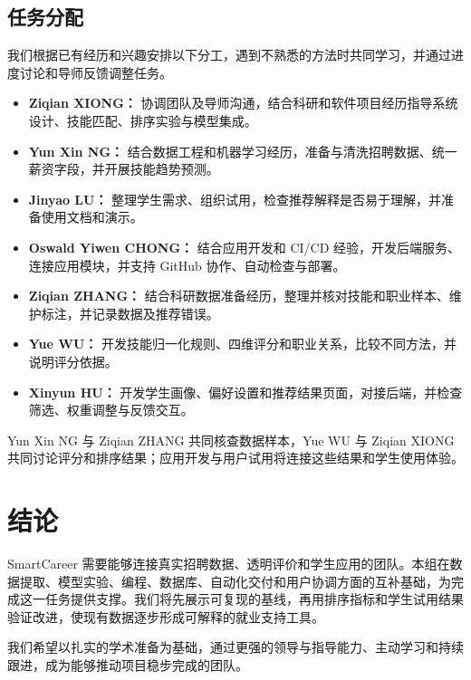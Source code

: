 \documentclass[a4paper,12pt]{article}
\begin{document}
\clearpage

\subsection{任务分配}
我们根据已有经历和兴趣安排以下分工，遇到不熟悉的方法时共同学习，并通过进度讨论和导师反馈调整任务。
\begin{itemize}
  \item \textbf{Ziqian XIONG：} 协调团队及导师沟通，结合科研和软件项目经历指导系统设计、技能匹配、排序实验与模型集成。
  \item \textbf{Yun Xin NG：} 结合数据工程和机器学习经历，准备与清洗招聘数据、统一薪资字段，并开展技能趋势预测。
  \item \textbf{Jinyao LU：} 整理学生需求、组织试用，检查推荐解释是否易于理解，并准备使用文档和演示。
  \item \textbf{Oswald Yiwen CHONG：} 结合应用开发和 CI/CD 经验，开发后端服务、连接应用模块，并支持 GitHub 协作、自动检查与部署。
  \item \textbf{Ziqian ZHANG：} 结合科研数据准备经历，整理并核对技能和职业样本、维护标注，并记录数据及推荐错误。
  \item \textbf{Yue WU：} 开发技能归一化规则、四维评分和职业关系，比较不同方法，并说明评分依据。
  \item \textbf{Xinyun HU：} 开发学生画像、偏好设置和推荐结果页面，对接后端，并检查筛选、权重调整与反馈交互。
\end{itemize}

Yun Xin NG 与 Ziqian ZHANG 共同核查数据样本，Yue WU 与 Ziqian XIONG 共同讨论评分和排序结果；应用开发与用户试用将连接这些结果和学生使用体验。

\clearpage
\section{结论}
SmartCareer 需要能够连接真实招聘数据、透明评价和学生应用的团队。本组在数据提取、模型实验、编程、数据库、自动化交付和用户协调方面的互补基础，为完成这一任务提供支撑。我们将先展示可复现的基线，再用排序指标和学生试用结果验证改进，使现有数据逐步形成可解释的就业支持工具。

我们希望以扎实的学术准备为基础，通过更强的领导与指导能力、主动学习和持续跟进，成为能够推动项目稳步完成的团队。
\end{document}

